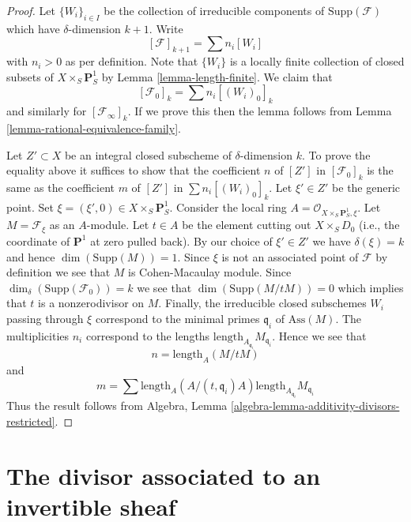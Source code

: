 \begin{proof}
Let $\{W_i\}_{i \in I}$ be the collection of irreducible
components of $\text{Supp}(\mathcal{F})$
which have $\delta$-dimension $k + 1$.
Write
$$
[\mathcal{F}]_{k + 1} = \sum n_i[W_i]
$$
with $n_i > 0$ as per definition. Note that $\{W_i\}$
is a locally finite collection of closed subsets of
$X \times_S \mathbf{P}^1_S$ by Lemma \ref{lemma-length-finite}.
We claim that
$$
[\mathcal{F}_0]_k = \sum n_i[(W_i)_0]_k
$$
and similarly for $[\mathcal{F}_\infty]_k$. If we prove this then the lemma
follows from Lemma \ref{lemma-rational-equivalence-family}.

\medskip\noindent
Let $Z' \subset X$ be an integral closed subscheme of $\delta$-dimension $k$.
To prove the equality above it suffices to show that the coefficient $n$
of $[Z']$ in $[\mathcal{F}_0]_k$ is the same as the coefficient $m$ of
$[Z']$ in $\sum n_i[(W_i)_0]_k$. Let $\xi' \in Z'$ be the generic point.
Set $\xi = (\xi', 0) \in  X \times_S \mathbf{P}^1_S$.
Consider the local ring $A = \mathcal{O}_{X \times_S \mathbf{P}^1_S, \xi}$.
Let $M = \mathcal{F}_\xi$ as an $A$-module.
Let $t \in A$ be the element cutting out $X \times_S D_0$
(i.e., the coordinate of $\mathbf{P}^1$ at zero pulled back).
By our choice of $\xi' \in Z'$ we have $\delta(\xi) = k$
and hence $\dim(\text{Supp}(M)) = 1$. Since $\xi$ is not an associated point
of $\mathcal{F}$ by definition we see that $M$ is Cohen-Macaulay module.
Since $\dim_\delta(\text{Supp}(\mathcal{F}_0)) = k$
we see that $\dim(\text{Supp}(M/tM)) = 0$ which implies that $t$
is a nonzerodivisor on $M$. Finally, the irreducible closed subschemes
$W_i$ passing through $\xi$ correspond to the minimal primes
$\mathfrak q_i$ of $\text{Ass}(M)$. The multiplicities $n_i$ correspond
to the lengths $\text{length}_{A_{\mathfrak q_i}}M_{\mathfrak q_i}$.
Hence we see that
$$
n = \text{length}_A(M/tM)
$$
and
$$
m = \sum
\text{length}_A(A/(t, \mathfrak q_i)A)
\text{length}_{A_{\mathfrak q_i}}M_{\mathfrak q_i}
$$
Thus the result follows from
Algebra, Lemma \ref{algebra-lemma-additivity-divisors-restricted}.
\end{proof}
















\section{The divisor associated to an invertible sheaf}
\label{section-divisor-invertible-sheaf}

